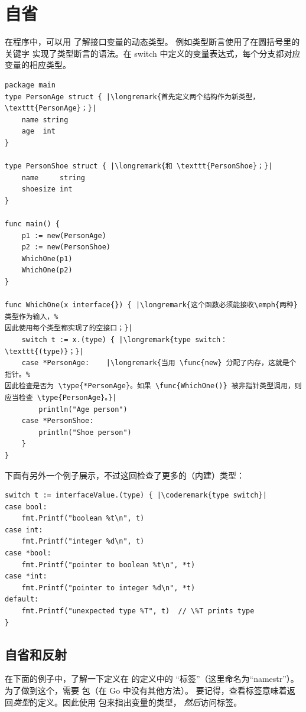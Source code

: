 \section{自省}
\label{sec:introspection}
在程序中，可以用  了解接口变量的动态类型。
例如类型断言使用了在圆括号里的关键字
 实现了类型断言的语法。在 switch 中定义的变量表达式，每个分支都对应变量的相应类型。
\begin{lstlisting}[caption=动态的找到类型]
package main
type PersonAge struct { |\longremark{首先定义两个结构作为新类型，\texttt{PersonAge}；}|
	name string
	age  int
}

type PersonShoe struct { |\longremark{和 \texttt{PersonShoe}；}|
	name     string
	shoesize int
}

func main() {
	p1 := new(PersonAge)
	p2 := new(PersonShoe)
	WhichOne(p1)
	WhichOne(p2)
}

func WhichOne(x interface{}) { |\longremark{这个函数必须能接收\emph{两种}类型作为输入，%
因此使用每个类型都实现了的空接口；}|
	switch t := x.(type) { |\longremark{type switch：\texttt{(type)}；}|
	case *PersonAge:	|\longremark{当用 \func{new} 分配了内存，这就是个指针。%
因此检查是否为 \type{*PersonAge}。如果 \func{WhichOne()} 被非指针类型调用，则应当检查 \type{PersonAge}。}|
		println("Age person")
	case *PersonShoe:
		println("Shoe person")
	}
}
\end{lstlisting}
\showremarks

下面有另外一个例子展示，不过这回检查了更多的（内建）类型：
\begin{lstlisting}[caption=更普通的 type switch]
switch t := interfaceValue.(type) { |\coderemark{type switch}|
case bool:
    fmt.Printf("boolean %t\n", t)
case int:
    fmt.Printf("integer %d\n", t)
case *bool:
    fmt.Printf("pointer to boolean %t\n", *t)
case *int:
    fmt.Printf("pointer to integer %d\n", *t)
default:
    fmt.Printf("unexpected type %T", t)  // \%T prints type
}
\end{lstlisting}

\subsection{自省和反射}
\label{subsec:introspection and reflection}
在下面的例子中，了解一下定义在  的定义中的 “标签”（这里命名为“namestr”）。
为了做到这个，需要  包（在 Go 中没有其他方法）。
要记得，查看标签意味着返回\emph{类型}的定义。因此使用  包来指出变量的类型，
\emph{然后}访问标签。

\showremarks

